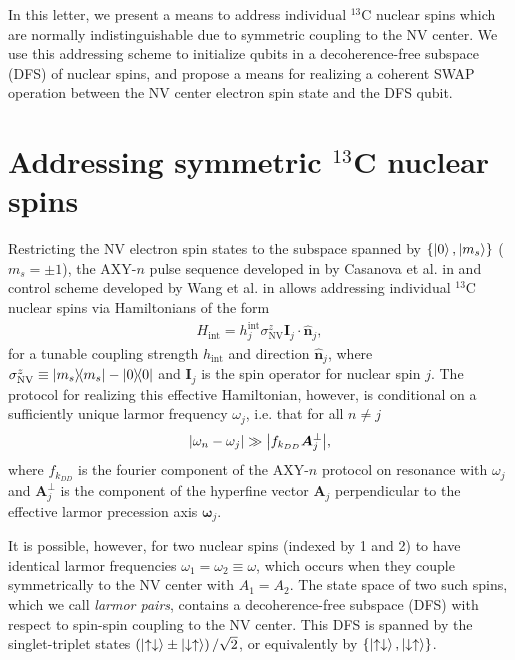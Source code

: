 \documentclass[twocolumn]{revtex4-1}
\renewcommand{\t}{\text} %
\newcommand{\p}[1]{\left(#1\right)} %
\renewcommand{\set}[1]{\left\{#1\right\}} %
\renewcommand{\v}{\bm} %
\newcommand{\uv}[1]{\hat{\v{#1}}} %
\renewcommand{\c}{\cdot} %
\renewcommand{\u}{\uparrow}
\renewcommand{\d}{\downarrow}
\newcommand{\NV}{\t{NV}}
\begin{document}
In this letter, we present a means to address individual $^{13}$C
nuclear spins which are normally indistinguishable due to symmetric
coupling to the NV center. We use this addressing scheme to initialize
qubits in a decoherence-free subspace (DFS) of nuclear spins, and
propose a means for realizing a coherent SWAP operation between the NV
center electron spin state and the DFS qubit.

\section{Addressing symmetric $^{13}$C nuclear spins}

Restricting the NV electron spin states to the subspace spanned by
$\set{\ket0,\ket{m_s}}$ ($m_s=\pm1$), the AXY-$n$ pulse sequence
developed in by Casanova et al. in \cite{casanova2015robust} and
control scheme developed by Wang et al. in \cite{wang2015positioning}
allows addressing individual $^{13}$C nuclear spins via Hamiltonians
of the form
\begin{align}
  H_\t{int} = h_j^\t{int}\sigma_\NV^z\v I_j\c\uv n_j,
  \label{H_int}
\end{align}
for a tunable coupling strength $h_\t{int}$ and direction $\uv n_j$,
where $\sigma_\NV^z\equiv\op{m_s}-\op{0}$ and $\v I_j$ is the spin
operator for nuclear spin $j$. The protocol for realizing this
effective Hamiltonian, however, is conditional on a sufficiently
unique larmor frequency $\omega_j$, i.e. that for all $n\ne j$
\begin{align}
  \abs{\omega_n-\omega_j} \gg \abs{f_{k_{DD}}\v A_j^\perp},
\end{align}
where $f_{k_{DD}}$ is the fourier component of the AXY-$n$ protocol on
resonance with $\omega_j$ and $\v A_j^\perp$ is the component of the
hyperfine vector $\v A_j$ perpendicular to the effective larmor
precession axis $\v\omega_j$.

It is possible, however, for two nuclear spins (indexed by 1 and 2) to
have identical larmor frequencies $\omega_1=\omega_2\equiv\omega$,
which occurs when they couple symmetrically to the NV center with
$A_1=A_2$. The state space of two such spins, which we call {\it
  larmor pairs}, contains a decoherence-free subspace (DFS) with
respect to spin-spin coupling to the NV center. This DFS is spanned by
the singlet-triplet states $\p{\ket{\u\d}\pm\ket{\d\u}}/\sqrt2$, or
equivalently by $\set{\ket{\u\d},\ket{\d\u}}$.
\end{document}
